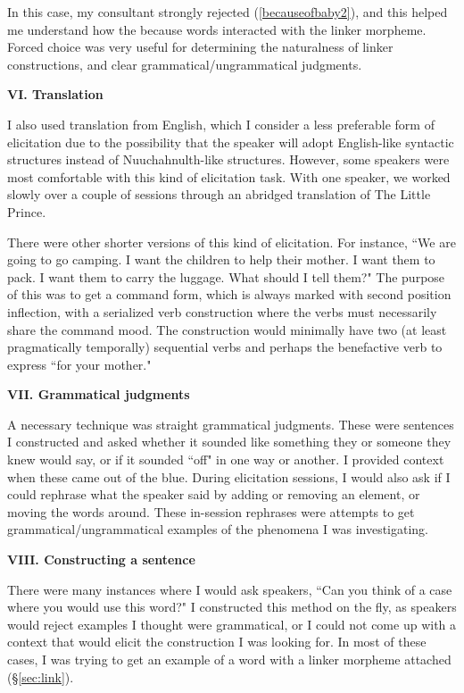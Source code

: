 In this case, my consultant strongly rejected (\ref{becauseofbaby2}), and this helped me understand how the because words interacted with the linker morpheme. Forced choice was very useful for determining the naturalness of linker constructions, and clear grammatical/ungrammatical judgments.

\vspace{8pt}

\noindent \textbf{VI. Translation}

I also used translation from English, which I consider a less preferable form of elicitation due to the possibility that the speaker will adopt English-like syntactic structures instead of Nuuchahnulth-like structures. However, some speakers were most comfortable with this kind of elicitation task. With one speaker, we worked slowly over a couple of sessions through an abridged translation of The Little Prince.

There were other shorter versions of this kind of elicitation. For instance, ``We are going to go camping. I want the children to help their mother. I want them to pack. I want them to carry the luggage. What should I tell them?" The purpose of this was to get a command form, which is always marked with second position inflection, with a serialized verb construction where the verbs must necessarily share the command mood. The construction would minimally have two (at least pragmatically temporally) sequential verbs and perhaps the benefactive verb to express ``for your mother."

\vspace{8pt}

\noindent \textbf{VII. Grammatical judgments}

A necessary technique was straight grammatical judgments. These were sentences I constructed and asked whether it sounded like something they or someone they knew would say, or if it sounded ``off" in one way or another. I provided context when these came out of the blue. During elicitation sessions, I would also ask if I could rephrase what the speaker said by adding or removing an element, or moving the words around. These in-session rephrases were attempts to get grammatical/ungrammatical examples of the phenomena I was investigating.

\vspace{8pt}

\noindent \textbf{VIII. Constructing a sentence}

There were many instances where I would ask speakers, ``Can you think of a case where you would use this word?" I constructed this method on the fly, as speakers would reject examples I thought were grammatical, or I could not come up with a context that would elicit the construction I was looking for. In most of these cases, I was trying to get an example of a word with a linker morpheme attached (\S\ref{sec:link}).

